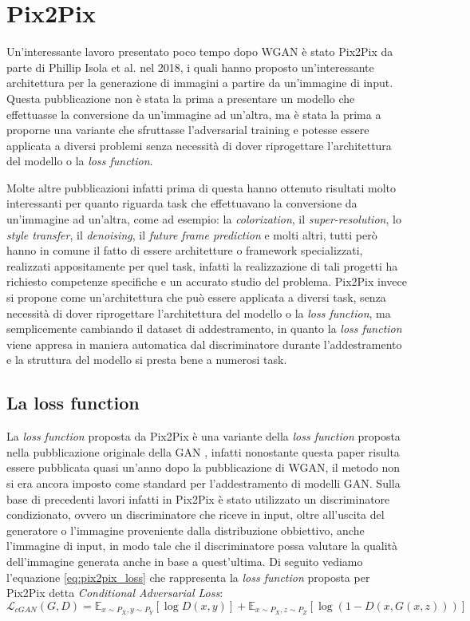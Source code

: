 \section{Pix2Pix}
Un'interessante lavoro presentato poco tempo dopo WGAN è stato Pix2Pix da parte di Phillip Isola et al. \cite{isola2018imagetoimage} nel 2018, i quali hanno proposto 
un'interessante architettura per la generazione di immagini a partire da un'immagine di input.
Questa pubblicazione non è stata la prima a presentare un modello che effettuasse la conversione da un'immagine ad un'altra, ma è stata la prima a 
proporne una variante che sfruttasse l'adversarial training e potesse essere applicata a diversi problemi senza necessità di dover riprogettare
l'architettura del modello o la \textit{loss function}.

Molte altre pubblicazioni infatti prima di questa hanno ottenuto risultati molto interessanti per quanto riguarda task che effettuavano la conversione
da un'immagine ad un'altra, come ad esempio: la \textit{colorization}, il \textit{super-resolution}, lo \textit{style transfer}, il \textit{denoising},
il \textit{future frame prediction} e molti altri, tutti però hanno in comune il fatto di essere architetture o framework specializzati, 
realizzati appositamente per quel task, infatti la realizzazione di tali progetti ha richiesto competenze specifiche e un accurato studio del problema.
Pix2Pix invece si propone come un'architettura che può essere applicata a diversi task, senza necessità di dover riprogettare l'architettura del modello
o la \textit{loss function}, ma semplicemente cambiando il dataset di addestramento, in quanto la \textit{loss function} viene appresa in maniera automatica
dal discriminatore durante l'addestramento e la struttura del modello si presta bene a numerosi task.

\subsection{La loss function}
La \textit{loss function} proposta da Pix2Pix è una variante della \textit{loss function} proposta nella pubblicazione originale della GAN \cite{goodfellow2014generative},
infatti nonostante questa paper risulta essere pubblicata quasi un'anno dopo la pubblicazione di WGAN, il metodo non si era ancora imposto come standard per
l'addestramento di modelli GAN.
Sulla base di precedenti lavori infatti in Pix2Pix è stato utilizzato un discriminatore condizionato, ovvero un discriminatore che riceve in input, oltre
all'uscita del generatore o l'immagine proveniente dalla distribuzione obbiettivo, anche l'immagine di input, in modo tale che il discriminatore possa
valutare la qualità dell'immagine generata anche in base a quest'ultima.
Di seguito vediamo l'equazione \ref{eq:pix2pix_loss} che rappresenta la \textit{loss function} proposta per Pix2Pix detta \textit{Conditional Adversarial Loss}:
\begin{equation}
    \label{eq:pix2pix_loss}
    \mathcal{L}_{cGAN}(G,D) = \mathbb{E}_{x \sim P_X,y \sim P_Y}[\log D(x,y)] + \mathbb{E}_{x \sim P_X,z \sim P_Z}[\log(1-D(x,G(x,z)))]
\end{equation}

